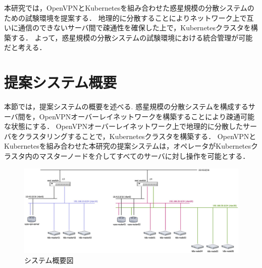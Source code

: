 本研究では，OpenVPNとKubernetesを組み合わせた惑星規模の分散システムのための試験環境を提案する．
地理的に分散することによりネットワーク上で互いに通信のできないサーバ間で疎通性を確保した上で，Kubernetesクラスタを構築する．
よって，惑星規模の分散システムの試験環境における統合管理が可能だと考える．

\section{提案システム概要}
\label{issue:about-system}

本節では，提案システムの概要を述べる.
惑星規模の分散システムを構成するサーバ間を，OpenVPNオーバーレイネットワークを構築することにより疎通可能な状態にする．
OpenVPNオーバーレイネットワーク上で地理的に分散したサーバをクラスタリングすることで，Kubernetesクラスタを構築する．
OpenVPNとKubernetesを組み合わせた本研究の提案システムは，オペレータがKubernetesクラスタ内のマスターノードを介してすべてのサーバに対し操作を可能とする．

\begin{figure}[htbp]
  \begin{center}
    \includegraphics[width=\textwidth]{./figures/system-diagram.jpg}
    \caption{システム概要図}
  \end{center}
\end{figure}


